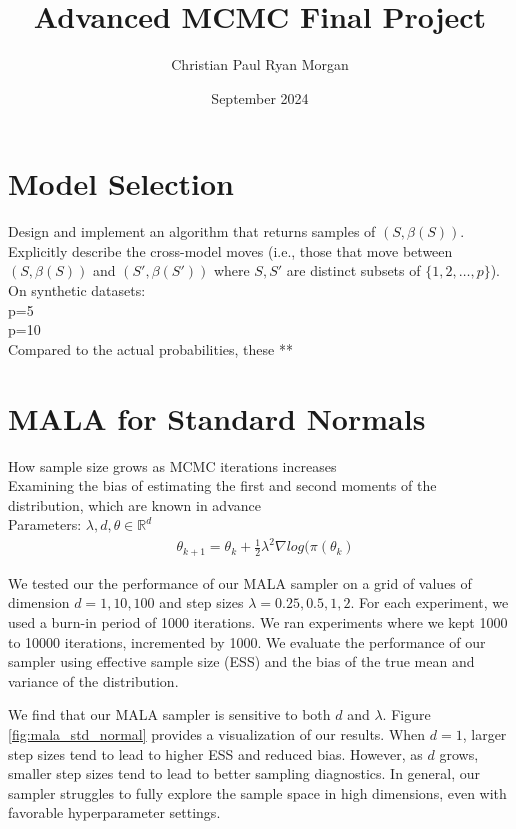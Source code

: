 \documentclass{article}
\title{Advanced MCMC Final Project}
\author{Christian Paul Ryan Morgan }
\date{September 2024}
\begin{document}
\maketitle

\section{Model Selection} 
Design and implement an algorithm that returns samples of $(S, \beta(S))$. Explicitly describe the cross-model moves (i.e., those that move between $(S, \beta(S))$ and $(S', \beta(S'))$ where $S, S'$ are distinct subsets of $\{1, 2, \dots, p\}$). \\ 

On synthetic datasets: \\
p=5 \\ 
p=10 \\
Compared to the actual probabilities, these ** \\ 


\section{MALA for Standard Normals}

How sample size grows as MCMC iterations increases \\
Examining the bias of estimating the first and second moments of the distribution, which are known in advance \\ 



Parameters: $\lambda, d, \theta \in\mathbb{R}^{d}$
\begin{align}
    & \theta_{k+1} = \theta_{k} + \frac{1}{2}\lambda^{2} \nabla log(\pi(\theta_{k}) 
\end{align}

We tested our the performance of our MALA sampler on a grid of values of dimension $d = 1, 10, 100$ and step sizes $\lambda = 0.25, 0.5, 1, 2$.
For each experiment, we used a burn-in period of 1000 iterations.
We ran experiments where we kept 1000 to 10000 iterations, incremented by 1000.
We evaluate the performance of our sampler using effective sample size (ESS) and the bias of the true mean and variance of the distribution.

We find that our MALA sampler is sensitive to both $d$ and $\lambda$.
Figure \ref{fig:mala_std_normal} provides a visualization of our results.
When $d = 1$, larger step sizes tend to lead to higher ESS and reduced bias.
However, as $d$ grows, smaller step sizes tend to lead to better sampling diagnostics.
In general, our sampler struggles to fully explore the sample space in high dimensions, even with favorable hyperparameter settings.
\end{document}
